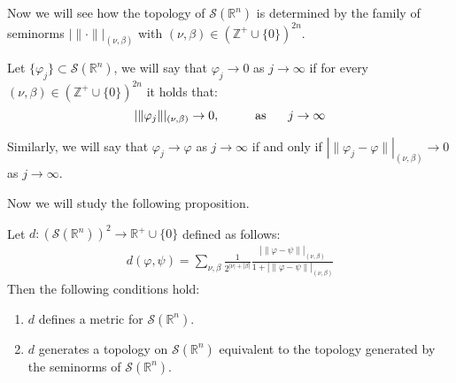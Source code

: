 Now we will see how the topology of $\mathcal{S}(\mathbb{R}^n)$ is determined by the family of seminorms $|\|\cdot\||_{(\nu,\beta)}$ with $(\nu,\beta)\in(\mathbb{Z}^+\cup\{0\})^{2n}$.
\begin{definition}{}
  Let $\{\varphi_j\}\subset \mathcal{S}(\mathbb{R}^n)$, we will say that $\varphi_j \rightarrow 0$ as $j \rightarrow \infty$ if for every $(\nu,\beta)\in(\mathbb{Z}^+\cup\{0\})^{2n}$ it holds that:
  $$|\|\varphi_j\||_{(\nu,\beta)}\rightarrow 0, \hspace{1cm} \text{as }\hspace{0.5cm}j\rightarrow \infty$$
\end{definition}
\begin{note}{}
  Similarly, we will say that $\varphi_j \rightarrow \varphi$ as $j\rightarrow \infty$ if and only if $|\|\varphi_j - \varphi \||_{(\nu,\beta)}\rightarrow 0$ as $j\rightarrow \infty$.
\end{note}
Now we will study the following proposition.
\begin{proposition}{}
  Let $d:(\mathcal{S}(\mathbb{R}^n))^2\rightarrow \mathbb{R}^+\cup \{0\}$ defined as follows:
  \begin{align*}
    d(\varphi,\psi)=\sum_{\nu,\beta}\frac{1}{2^{|\nu|+|\beta|}}\frac{|\|\varphi-\psi\||_{(\nu,\beta)}}{1+|\|\varphi-\psi\||_{(\nu,\beta)}}
  \end{align*}
  Then the following conditions hold:
  \begin{enumerate}
    \item $d$ defines a metric for $\mathcal{S}(\mathbb{R}^n)$.
    \item $d$ generates a topology on $\mathcal{S}(\mathbb{R}^n)$ equivalent to the topology generated by the seminorms of $\mathcal{S}(\mathbb{R}^n)$.
  \end{enumerate}
\end{proposition}

